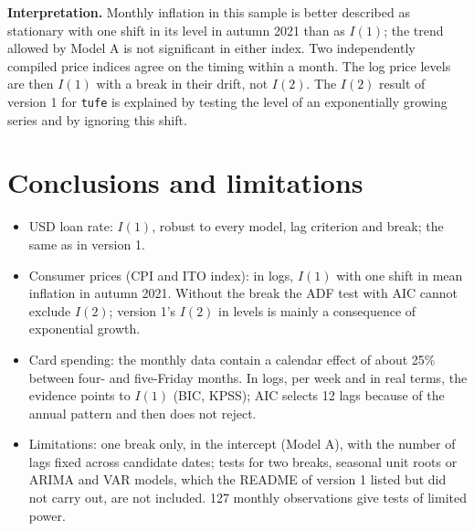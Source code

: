 \documentclass[11pt,a4paper]{article}
\begin{document}
\textbf{Interpretation.} Monthly inflation in this sample is better described as stationary with one shift in its level in autumn
2021 than as $I(1)$; the trend allowed by Model A is not significant in either index. Two independently compiled price indices agree on the timing within a month. The log price levels are then
$I(1)$ with a break in their drift, not $I(2)$. The $I(2)$ result of version 1 for \texttt{tufe} is explained by testing the level of an
exponentially growing series and by ignoring this shift.

\section{Conclusions and limitations}

\begin{itemize}
  \item USD loan rate: $I(1)$, robust to every model, lag criterion and break; the same as in version 1.
  \item Consumer prices (CPI and ITO index): in logs, $I(1)$ with one shift in mean inflation in autumn 2021. Without the break the
  ADF test with AIC cannot exclude $I(2)$; version 1's $I(2)$ in levels is mainly a consequence of exponential growth.
  \item Card spending: the monthly data contain a calendar effect of about 25\% between four- and five-Friday months. In logs, per
  week and in real terms, the evidence points to $I(1)$ (BIC, KPSS); AIC selects 12 lags because of the annual pattern and then
  does not reject.
  \item Limitations: one break only, in the intercept (Model A), with the number of lags fixed across candidate dates; tests for two breaks, seasonal unit roots or ARIMA and VAR models, which the
  README of version 1 listed but did not carry out, are not included. 127 monthly observations give tests of limited power.
\end{itemize}
\end{document}
